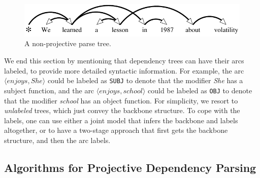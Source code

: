 \begin{figure}
\begin{center}
    \includegraphics[width=1\columnwidth]{figs/parsing/example_nonproj}
  \caption{A non-projective parse tree.}
  \label{fig:deptree_nonproj}
  \end{center}
\end{figure}

We end this section by mentioning that dependency trees can have their arcs labeled, to provide more detailed syntactic information. 
For example, the arc $\langle enjoys, She \rangle$ could be labeled as {\tt SUBJ} to denote that the modifier \emph{She} has a subject function, and 
the arc $\langle enjoys, school \rangle$ could be labeled as {\tt OBJ} to denote that the modifier \emph{school} has an object function. 
For simplicity, we resort to \emph{unlabeled} trees, which just convey the backbone structure. To cope with the labels, one can use either a joint model 
that infers the backbone and labels altogether, or to have a two-stage approach that first gets the backbone structure, and then the arc labels. 

\subsection{Algorithms for Projective Dependency Parsing}


